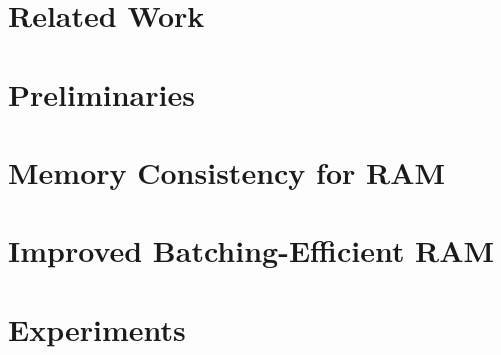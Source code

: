 \documentclass{llncs}
\begin{document}




\section{Related Work}\label{sec:rel-work}
	

\section{Preliminaries}\label{sec:prelims}
    

	

\section{Memory Consistency for RAM}\label{sec:model-for-ram}


\section{Improved Batching-Efficient RAM}\label{sec:batch-efficient-ram}


\section{Experiments}\label{sec:experiments}




\appendix

\end{document}
